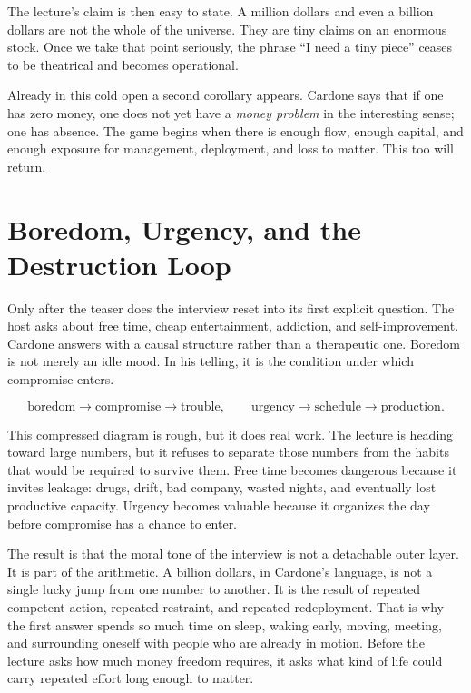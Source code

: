 The lecture's claim is then easy to state. A million dollars and even a billion dollars are not the whole of the universe. They are tiny claims on an enormous stock. Once we take that point seriously, the phrase ``I need a tiny piece'' ceases to be theatrical and becomes operational.

Already in this cold open a second corollary appears. Cardone says that if one has zero money, one does not yet have a \emph{money problem} in the interesting sense; one has absence. The game begins when there is enough flow, enough capital, and enough exposure for management, deployment, and loss to matter. This too will return.

\section{Boredom, Urgency, and the Destruction Loop}

Only after the teaser does the interview reset into its first explicit question. The host asks about free time, cheap entertainment, addiction, and self-improvement. Cardone answers with a causal structure rather than a therapeutic one. Boredom is not merely an idle mood. In his telling, it is the condition under which compromise enters.

\begin{equation}
\text{boredom} \to \text{compromise} \to \text{trouble},
\qquad
\text{urgency} \to \text{schedule} \to \text{production}.
\end{equation}

This compressed diagram is rough, but it does real work. The lecture is heading toward large numbers, but it refuses to separate those numbers from the habits that would be required to survive them. Free time becomes dangerous because it invites leakage: drugs, drift, bad company, wasted nights, and eventually lost productive capacity. Urgency becomes valuable because it organizes the day before compromise has a chance to enter.

The result is that the moral tone of the interview is not a detachable outer layer. It is part of the arithmetic. A billion dollars, in Cardone's language, is not a single lucky jump from one number to another. It is the result of repeated competent action, repeated restraint, and repeated redeployment. That is why the first answer spends so much time on sleep, waking early, moving, meeting, and surrounding oneself with people who are already in motion. Before the lecture asks how much money freedom requires, it asks what kind of life could carry repeated effort long enough to matter.

